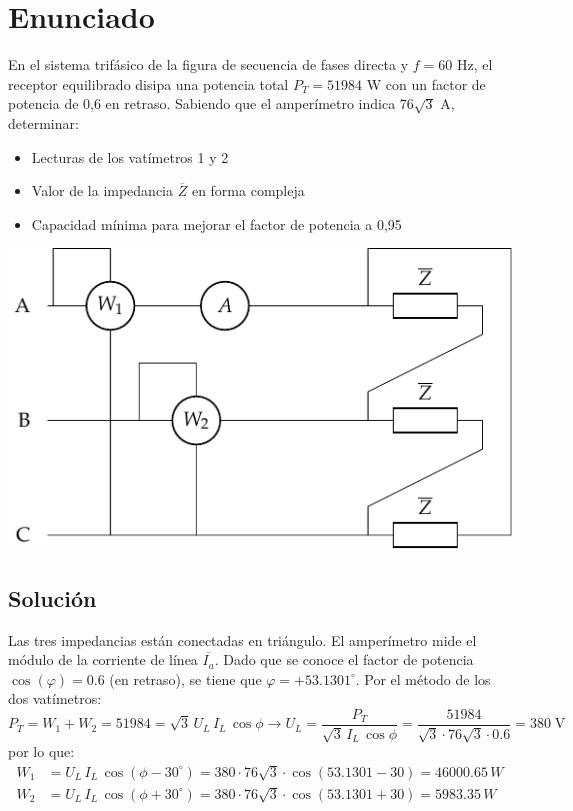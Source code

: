  \section{Enunciado}
 
En el sistema trifásico de la figura de secuencia de fases directa y $f=60$ Hz, el receptor equilibrado disipa una potencia total $P_T =51984$ W con un factor de potencia de 0,6 en
retraso. Sabiendo que el amperímetro indica 76$\sqrt{3}$ A,
determinar:
\begin{itemize}
    \item  Lecturas de los vatímetros 1 y 2
    \item  Valor de la impedancia $\overline{Z}$ en forma compleja
    \item Capacidad mínima para mejorar el factor de potencia a 0,95
\end{itemize}

\begin{center}
  \includegraphics[width=0.4\linewidth]{figuras/ej4_BT3.pdf}
\end{center}


\subsection*{Solución}
Las tres impedancias están conectadas en triángulo. El amperímetro mide el módulo de la corriente de línea $\overline{I_a}$. Dado que se conoce el factor de potencia $\cos(\varphi)=0.6$ (en retraso), se tiene que $\varphi=+53.1301^\circ$. Por el método de los dos vatímetros:
\begin{equation*}
    P_T=W_1+W_2=51984=\sqrt{3}\, U_L\, I_L\, \cos{\phi}\rightarrow U_L=\dfrac{P_T}{\sqrt{3}\, I_L\,\cos{\phi}}=\dfrac{51984}{\sqrt{3}\cdot 76\sqrt{3}\cdot 0.6}=380\;\text{V}
\end{equation*}
por lo que: 
\begin{align*}
    W_1&=U_L\,I_L\,\cos(\phi-30^\circ)=380\cdot 76\sqrt{3}\cdot\cos(53.1301-30)=46000.65\,W\\
    W_2&=U_L\,I_L\,\cos(\phi+30^\circ)=380\cdot 76\sqrt{3}\cdot\cos(53.1301+30)=5983.35\,W
\end{align*}
  
